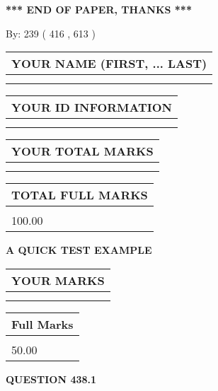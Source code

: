 \documentclass[12pt]{article}
\begin{document}
\vspace{1.0in} 
{\textbf{\large{ *** END OF PAPER, THANKS *** }}} 
   
   
\hspace{1.0in} By: 
 239 ( 416 ,  613 )
   
   
   
   
\newpage 
\setcounter{page}{ 
   438001 } 
   
   
   
   
\noindent\begin{tabular}{|l|}
\hline
YOUR NAME (FIRST, ... LAST)  \\
\hline
 \\ 
 \\ 
\hline
\end{tabular}
\hspace{0.05in} \begin{tabular}{|l|}
\hline
 YOUR   ID   INFORMATION  \\
\hline
 \\ 
 \\ 
\hline
\end{tabular}
   
   
\vspace{0.2in}\noindent\begin{tabular}{|l|}
\hline
YOUR TOTAL MARKS  \\
\hline
 \\ 
 \\ 
\hline
\end{tabular}
\hspace{0.05in} \begin{tabular}{|l|}
\hline
TOTAL FULL MARKS  \\
\hline
 \\ 
100.00 \\
\hline
\end{tabular}
   
   
 \vspace{0.2in}
{\LARGE {\textbf{ A QUICK TEST EXAMPLE}}}
   
   
  
\vspace{0.2in}
  
\noindent\begin{tabular}{|l|}
\hline
 YOUR MARKS  \\
\hline
 \\ 
 \\ 
\hline
\end{tabular}
\hspace{0.05in} \begin{tabular}{|l|}
\hline
 Full Marks  \\
\hline
 \\ 
50.00 \\
\hline
\end{tabular}
{\textbf{\Large{QUESTION
438.1 
}}}
  
\end{document}
